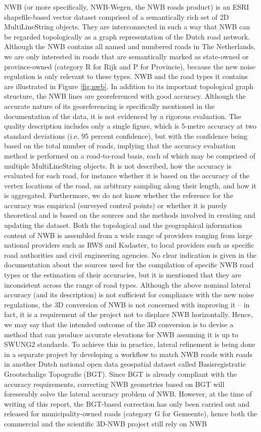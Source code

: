 NWB (or more specifically, NWB-Wegen, the NWB roads product) is an ESRI shapefile-based vector dataset comprised of a semantically rich set of 2D MultiLineString objects. They are interconnected in such a way that NWB can be regarded topologically as a graph representation of the Dutch road network. Although the NWB contains all named and numbered roads in The Netherlands, we are only interested in roads that are semantically marked as state-owned or province-owned (category R for Rijk and P for Provincie), because the new noise regulation is only relevant to these types. NWB and the road types it contains are illustrated in Figure \ref{fig:nwb}. In addition to its important topological graph structure, the NWB lines are georeferenced with good accuracy. Although the accurate nature of its georeferencing is specifically mentioned in the documentation of the data, it is not evidenced by a rigorous evaluation. The quality description includes only a single figure, which is 5-metre accuracy at two standard deviations (i.e. 95 percent confidence), but with the confidence being based on the total number of roads, implying that the accuracy evaluation method is performed on a road-to-road basis, each of which may be comprised of multiple MultiLineString objects. It is not described, how the accuracy is evaluated for each road, for instance whether it is based on the accuracy of the vertex locations of the road, an arbitrary sampling along their length, and how it is aggregated. Furthermore, we do not know whether the reference for the accuracy was empirical (surveyed control points) or whether it is purely theoretical and is based on the sources and the methods involved in creating  and updating the dataset. Both the topological and the geographical information content of NWB is assembled from a wide range of providers ranging from large national providers such as RWS and Kadaster, to local providers such as specific road authorities and civil engineering agencies. No clear indication is given in the documentation about the sources used for the compilation of specific NWB road types or the estimation of their accuracies, but it is mentioned that they are inconsistent across the range of road types. Although the above nominal lateral accuracy (and its description) is not sufficient for compliance with the new noise regulations, the 3D conversion of NWB is not concerned with improving it – in fact, it is a requirement of the project not to displace NWB horizontally. Hence, we may say that the intended outcome of the 3D conversion is to devise a method that can produce accurate elevations for NWB assuming it  is up to SWUNG2 standards. To achieve this in practice, lateral refinement is being done in a separate project by developing a workflow to match NWB roads with roads in another Dutch national open data geospatial dataset called Basisregistratie Grootschalige Topografie (BGT). Since BGT is already compliant with the accuracy requirements, correcting NWB geometries based on BGT will foreseeably solve the lateral accuracy problem of NWB. However, at the time of writing of this report, the BGT-based correction has only been carried out and released for municipality-owned roads (category G for Gemeente), hence both the commercial and the scientific 3D-NWB project still rely on NWB 